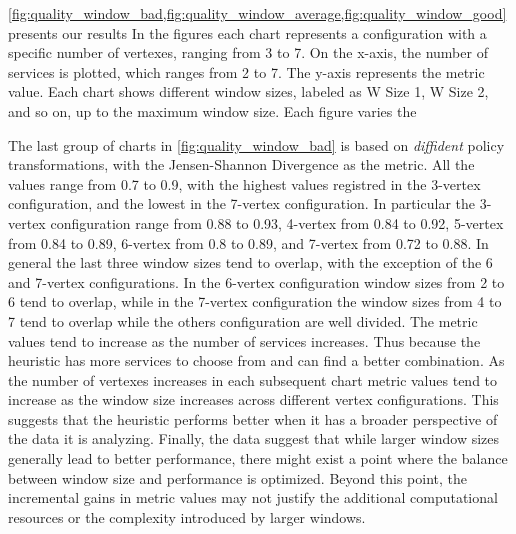 

\cref{fig:quality_window_bad,fig:quality_window_average,fig:quality_window_good} presents our results
In the figures each chart represents a configuration with a specific number of vertexes, ranging from 3 to 7.
On the x-axis, the number of services is plotted, which ranges from 2 to 7.
The y-axis represents the metric value.
Each chart shows different window sizes, labeled as W Size 1, W Size 2, and so on, up to the maximum window size.
Each figure varies the


The last group of charts in \cref{fig:quality_window_bad} is based on \textit{diffident} policy transformations, with the Jensen-Shannon Divergence as the metric.
All the values range from 0.7 to 0.9, with the highest values registred in the 3-vertex
configuration, and the lowest in the 7-vertex configuration.
In particular the 3-vertex configuration range from 0.88 to 0.93, 4-vertex from 0.84 to 0.92, 5-vertex from 0.84 to 0.89, 6-vertex from 0.8 to 0.89, and 7-vertex from 0.72 to 0.88.
In general the last three window sizes tend to overlap, with the exception of the 6 and 7-vertex configurations.
In the 6-vertex configuration window sizes from 2 to 6 tend to overlap, while in the 7-vertex configuration the window sizes from 4 to 7 tend to overlap while the others configuration are well divided.
The metric values tend to increase as the number of services increases. Thus because the heuristic has more services to choose from and can find a better combination.
As the number of vertexes increases in each subsequent chart metric values tend to increase as the window size increases across different vertex configurations.
This suggests that the heuristic performs better when it has a broader perspective of the data it is analyzing.
Finally, the data suggest that while larger window sizes generally lead to better performance,
there might exist a point where the balance between window size and performance is optimized.
Beyond this point, the incremental gains in metric values may not justify the additional computational resources or the complexity introduced by larger windows.



